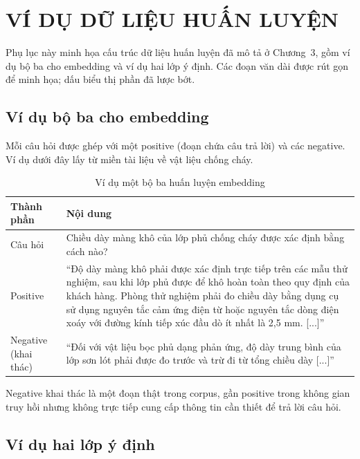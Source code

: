 \chapter{VÍ DỤ DỮ LIỆU HUẤN LUYỆN}
\label{appendix:B}

Phụ lục này minh họa cấu trúc dữ liệu huấn luyện đã mô tả ở Chương~3, gồm ví dụ bộ ba cho embedding và ví dụ hai lớp ý định. Các đoạn văn dài được rút gọn để minh họa; dấu \plaincode{[...]} biểu thị phần đã lược bớt.

\section{Ví dụ bộ ba cho embedding}
\label{appendix:B.1}

Mỗi câu hỏi được ghép với một positive (đoạn chứa câu trả lời) và các negative. Ví dụ dưới đây lấy từ miền tài liệu về vật liệu chống cháy.

\begin{table}[H]
    \centering
    \caption{Ví dụ một bộ ba huấn luyện embedding}
    \label{tab:appendix-triplet-example}
    {\small
    \begin{tabular}{|>{\raggedright\arraybackslash}p{2.5cm}|>{\raggedright\arraybackslash}p{10.5cm}|}
        \hline
        \textbf{Thành phần} & \textbf{Nội dung} \\ \hline
        Câu hỏi & Chiều dày màng khô của lớp phủ chống cháy được xác định bằng cách nào? \\ \hline
        Positive & ``Độ dày màng khô phải được xác định trực tiếp trên các mẫu thử nghiệm, sau khi lớp phủ được để khô hoàn toàn theo quy định của khách hàng. Phòng thử nghiệm phải đo chiều dày bằng dụng cụ sử dụng nguyên tắc cảm ứng điện từ hoặc nguyên tắc dòng điện xoáy với đường kính tiếp xúc đầu dò ít nhất là 2,5 mm. [...]'' \\ \hline
        Negative (khai thác) & ``Đối với vật liệu bọc phủ dạng phản ứng, độ dày trung bình của lớp sơn lót phải được đo trước và trừ đi từ tổng chiều dày [...]'' \\ \hline
    \end{tabular}
    }
\end{table}

Negative khai thác là một đoạn thật trong corpus, gần positive trong không gian truy hồi nhưng không trực tiếp cung cấp thông tin cần thiết để trả lời câu hỏi.

\section{Ví dụ hai lớp ý định}
\label{appendix:B.2}

